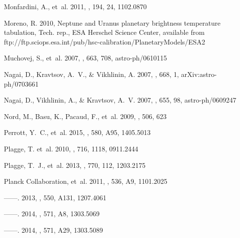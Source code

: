 \documentclass[traditabstract]{aa}
\begin{document}
\begin{thebibliography}{81}
Monfardini, A., {et~al.} 2011, \apjs, 194, 24, 1102.0870

{Moreno}, R. 2010, {Neptune and Uranus planetary brightness temperature
  tabulation}, Tech. rep., ESA Herschel Science Center, available from
  ftp://ftp.sciops.esa.int/pub/hsc-calibration/PlanetaryModels/ESA2

Muchovej, S., {et~al.} 2007, \apj, 663, 708, astro-ph/0610115

{Nagai}, D., {Kravtsov}, A.~V., \& {Vikhlinin}, A. 2007, \apj, 668, 1,
  arXiv:astro-ph/0703661

Nagai, D., Vikhlinin, A., \& Kravtsov, A.~V. 2007, \apj, 655, 98,
  astro-ph/0609247

Nord, M., Basu, K., Pacaud, F., {et~al.} 2009, \aap, 506, 623

Perrott, Y.~C., {et~al.} 2015, \aap, 580, A95, 1405.5013

{Plagge}, T. {et~al.} 2010, \apj, 716, 1118, 0911.2444

Plagge, T.~J., {et~al.} 2013, \apj, 770, 112, 1203.2175

{Planck Collaboration}, {et~al.} 2011, \aap, 536, A9, 1101.2025

------. 2013, \aap, 550, A131, 1207.4061

------. 2014{}, \aap, 571, A8, 1303.5069

------. 2014{}, \aap, 571, A29, 1303.5089


\end{thebibliography}
\end{document}
